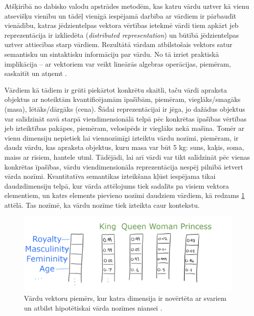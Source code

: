 Atšķirībā no dabisko valodu apstrādes metodēm, kas katru vārdu uztver kā vienu atsevišķu vienību un tādēļ vienīgā iespējamā darbība ar vārdiem ir pārbaudīt vienādību, katras jēdzientelpas vektora vērtības ietekmē vārdi tiem apkārt jeb reprezentācija ir izkliedēta (\textit{distributed representation}) un būtībā jēdzientelpas uztver attiecības starp vārdiem. Rezultātā vārdam atbilstošais vektors satur semantisku un sintaktisku informāciju par vārdu. No tā izriet praktiskā implikācija -- ar vektoriem var veikt lineārās algebras operācijas, piemēram, saskaitīt un atņemt \cite{colyer2016}.

Vārdiem kā tādiem ir grūti piekārtot konkrētu skaitli, taču vārdi apraksta objektus ar noteiktām kvantificējamām īpašībām, piemēram, vieglāks/smagāks (masa), lētāks/dārgāks (cena). Šādai reprezentācijai ir jēga, jo dažādus objektus var salīdzināt savā starpā viendimensionālā telpā pēc konkrētas īpašības vērtības jeb izteiktības pakāpes, piemēram, velosipēds ir vieglāks nekā mašīna. Tomēr ar vienu dimensiju nepietiek lai viennozīmīgi izteiktu vārdu nozīmi, piemēram, ir daudz vārdu, kas apraksta objektus, kuru masa var būt 5 kg: suns, kaķis, soma, maiss ar rīsiem, hantele utml. Tādējādi, lai arī vārdi var tikt salīdzināt pēc vienas konkrētas īpašības, vārdu viendimensionāla reprezentācija nespēj pilnībā ietvert vārda nozīmi. Kvantitatīva semantikas izteikšana kļūst iespējama tikai daudzdimensiju telpā, kur vārda attēlojums tiek sadalīts pa visiem vektora elementiem, un katrs elements pievieno nozīmi daudziem vārdiem, kā redzams \ref{fig:distributed-representation} attēlā. Tas nozīmē, ka vārdu nozīme tiek izteikta caur kontekstu.


\begin{figure}[h]
	\centering
	\includegraphics[width=\textwidth]{figures/word2vec-distributed-representation.png}
	\caption{Vārdu vektoru piemērs, kur katra dimensija ir novērtēta ar svariem un atbilst hipotētiskai vārda nozīmes niansei \cite{colyer2016}.}
	\label{fig:distributed-representation}
\end{figure}

